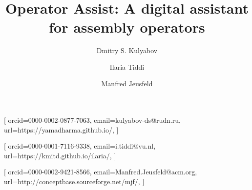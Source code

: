 \documentclass[
]{ceurart}
\begin{document}


\title{Operator Assist: A digital assistant for assembly operators}


\author[1,2]{Dmitry S. Kulyabov}[%
orcid=0000-0002-0877-7063,
email=kulyabov-ds@rudn.ru,
url=https://yamadharma.github.io/,
]
\cormark[1]
\fnmark[1]
\address[1]{Peoples' Friendship University of Russia (RUDN University),
  6 Miklukho-Maklaya St, Moscow, 117198, Russian Federation}
\address[2]{Joint Institute for Nuclear Research,
  6 Joliot-Curie, Dubna, Moscow region, 141980, Russian Federation}

\author[3]{Ilaria Tiddi}[%
orcid=0000-0001-7116-9338,
email=i.tiddi@vu.nl,
url=https://kmitd.github.io/ilaria/,
]
\fnmark[1]
\address[3]{Vrije Universiteit Amsterdam, De Boelelaan 1105, 1081 HV Amsterdam, The Netherlands}

\author[4]{Manfred Jeusfeld}[%
orcid=0000-0002-9421-8566,
email=Manfred.Jeusfeld@acm.org,
url=http://conceptbase.sourceforge.net/mjf/,
]
\fnmark[1]
\address[4]{University of Skövde, Högskolevägen 1, 541 28 Skövde, Sweden}

\end{document}
